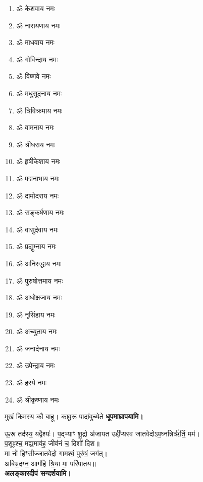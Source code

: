 \begin{center}
\begin{multicols}{2}
\begin{enumerate}
\item ॐ केशवाय नमः
\item ॐ नारायणाय नमः
\item ॐ माधवाय नमः
\item ॐ गोविन्दाय नमः
\item ॐ विष्णवे नमः	
\item ॐ मधुसूदनाय नमः
\item ॐ त्रिविक्रमाय नमः
\item ॐ वामनाय नमः
\item ॐ श्रीधराय नमः
\item ॐ हृषीकेशाय नमः
\item ॐ पद्मनाभाय नमः
\item ॐ दामोदराय नमः
\item ॐ सङ्कर्षणाय नमः
\item ॐ वासुदेवाय नमः
\item ॐ प्रद्युम्नाय नमः
\item ॐ अनिरुद्धाय नमः
\item ॐ पुरुषोत्तमाय नमः
\item ॐ अधोक्षजाय नमः
\item ॐ नृसिंहाय नमः
\item ॐ अच्युताय नमः
\item ॐ जनार्दनाय नमः
\item ॐ उपेन्द्राय नमः
\item ॐ हरये नमः
\item ॐ श्रीकृष्णाय नमः
\end{enumerate}
\end{multicols}
\clearpage

\begingroup
\setlength{\columnseprule}{1pt}
\let\chapt\sect
\begingroup

\endgroup

\endgroup

\closesub


{मुखं॒ किम॑स्य॒ कौ बा॒हू। कावू॒रू पादा॑वुच्येते}
\textbf{\devAya{} धूपमाघ्रापयामि।}
\medskip

{ऊ॒रू तद॑स्य॒ यद्वैश्यः॑। प॒द्भ्याꣳ शू॒द्रो अ॑जायत}
उद्दी᳚प्यस्व जातवेदोऽप॒घ्नन्निर्ऋ॑तिं॒ मम॑।\\
प॒शूꣴश्च॒ मह्य॒माव॑ह॒ जीव॑नं च॒ दिशो॑ दिश॥ \\
मा नो॑ हिꣳसीज्जातवेदो॒ गामश्वं॒ पुरु॑षं॒ जग॑त्।\\
अबि॑भ्र॒दग्न॒ आग॑हि श्रि॒या मा॒ परि॑पातय॥ \\
\textbf{\devAya{} अलङ्कारदीपं सन्दर्शयामि।}
\medskip


\end{center}
